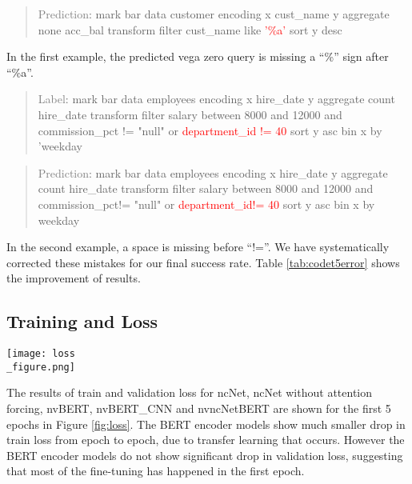 \documentclass[
	a4paper, %
	10pt, %
	unnumberedsections, %
	twoside, %
]{t0003}
\newcommand{\gray}[1]{\textcolor{gray}{#1}}
\newcommand{\red}[1]{\textcolor{red}{#1}}
\begin{document}
\begin{appendices}
\begin{quote}
\gray{Prediction}: mark bar data customer encoding x cust\_name y aggregate none acc\_bal transform filter cust\_name like \red{'\%a'} sort y desc
\end{quote}

In the first example, the predicted vega zero query is missing a ``\%'' sign after ``\%a''.

\begin{quote}
\gray{Label}: mark bar data employees encoding x hire\_date y aggregate count hire\_date transform filter salary between 8000 and 12000 and commission\_pct != "null" or \red{department\_id != 40} sort y asc bin x by 'weekday
\end{quote}

\begin{quote}
\gray{Prediction}: mark bar data employees encoding x hire\_date y aggregate count hire\_date transform filter salary between 8000 and 12000 and commission\_pct!= "null" or \red{department\_id!= 40} sort y asc bin x by weekday
\end{quote}

In the second example, a space is missing before ``!=''. We have systematically corrected these mistakes for our final success rate. Table \ref{tab:codet5error} shows the improvement of results.

\subsection{Training and Loss}

\begin{figure*}
	\texttt{[image: loss\\\_figure.png]}
	\caption{Train and validation loss of models.}
	\label{fig:loss}
\end{figure*}

The results of train and validation loss for ncNet, ncNet without attention forcing, nvBERT, nvBERT\_CNN and nvncNetBERT are shown for the first 5 epochs in Figure \ref{fig:loss}. The BERT encoder models show much smaller drop in train loss from epoch to epoch, due to transfer learning that occurs. However the BERT encoder models do not show significant drop in validation loss, suggesting that most of the fine-tuning has happened in the first epoch.

\end{appendices}
\end{document}
